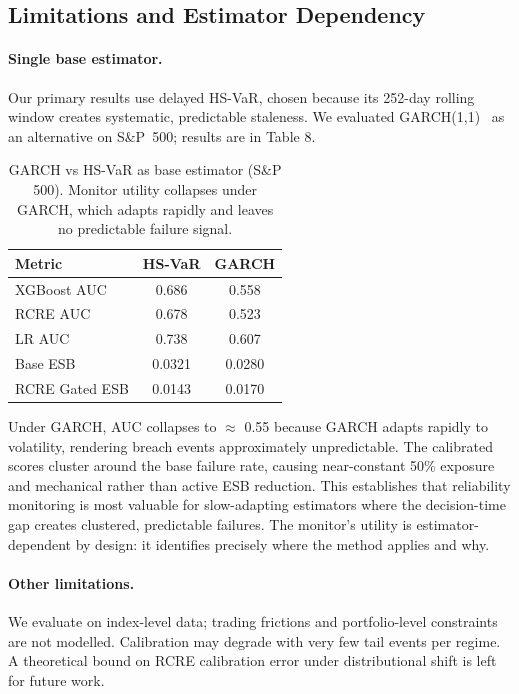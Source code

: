 \documentclass[sigconf, anonymous]{acmart}
\begin{document}
\subsection{Limitations and Estimator Dependency}
\label{sec:limitations}

\paragraph{Single base estimator.} Our primary results use delayed HS-VaR, chosen because its 252-day rolling window creates systematic, predictable staleness. We evaluated GARCH(1,1)~\cite{bollerslev1986generalized,engle1982arch} as an alternative on S\&P~500; results are in Table 8.

\begin{table}[t]
\caption{GARCH vs HS-VaR as base estimator (S\&P 500). Monitor utility collapses under GARCH, which adapts rapidly and leaves no predictable failure signal.}
\label{tab:garch}
\small
\begin{tabular}{lcc}
\toprule
\textbf{Metric} & \textbf{HS-VaR} & \textbf{GARCH} \\
\midrule
XGBoost AUC    & 0.686 & 0.558 \\
RCRE AUC       & 0.678 & 0.523 \\
LR AUC         & 0.738 & 0.607 \\
Base ESB       & 0.0321 & 0.0280 \\
RCRE Gated ESB & 0.0143 & 0.0170 \\
\bottomrule
\end{tabular}
\end{table}

Under GARCH, AUC collapses to $\approx$ 0.55 because GARCH adapts rapidly to volatility, rendering breach events approximately unpredictable. The calibrated scores cluster around the base failure rate, causing near-constant 50\% exposure and mechanical rather than active ESB reduction. This establishes that reliability monitoring is most valuable for slow-adapting estimators where the decision-time gap creates clustered, predictable failures. The monitor's utility is estimator-dependent by design: it identifies precisely where the method applies and why.

\paragraph{Other limitations.} We evaluate on index-level data; trading frictions and portfolio-level constraints are not modelled. Calibration may degrade with very few tail events per regime. A theoretical bound on RCRE calibration error under distributional shift is left for future work.
\end{document}

